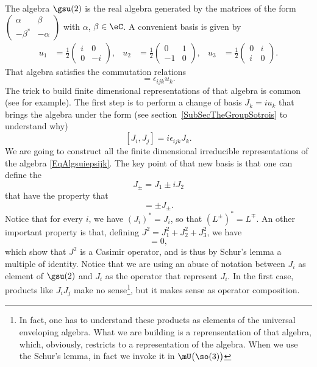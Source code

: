 The algebra $\gsu(2)$ is the real algebra generated by the matrices of the form
$
\begin{pmatrix}
\alpha  &\beta\\
-\beta^*&-\alpha
\end{pmatrix}
$ with $\alpha$, $\beta\in\eC$. A convenient basis is given by
\begin{align}       \label{EqGenssudeux}
u_1&=\frac{ 1 }{2}
\begin{pmatrix}
  i &   0   \\
  0 &   -i
\end{pmatrix},
&u_2&=
\frac{ 1 }{2}
\begin{pmatrix}
  0 &   1   \\
  -1    &   0
\end{pmatrix},
&u_3&=\frac{ 1 }{2}
\begin{pmatrix}
  0 &   i   \\
  i &   0
\end{pmatrix}.
\end{align}
That algebra satisfies the commutation relations
\begin{equation}
    [u_i,u_j]=\epsilon_{ijk}u_k.
\end{equation}
The trick to build finite dimensional representations of that algebra is common (see \cite{MQSenechal} for example). The first step is to perform a change of basis $J_k=iu_k$ that brings the algebra under the form (see section~\ref{SubSecTheGroupSotrois} to understand why)
\begin{equation}        \label{EqAlgsuiepsijk}
    [J_i,J_j]=i\epsilon_{ijk}J_k.
\end{equation}
We are going to construct all the finite dimensional irreducible representations of the algebra \eqref{EqAlgsuiepsijk}. The key point of that new basis is that one can define the 
\begin{equation}
    J_{\pm}=J_1\pm iJ_2
\end{equation}
that have the property that
\begin{equation}
    [J_3,J_{\pm}]=\pm J_{\pm}.
\end{equation}
Notice that for every $i$, we have $(J_i)^*=J_i$, so that $(L^{\pm})^*=L^{\mp}$. An other important property is that, defining $J^2=J_1^2+J_2^2+J_3^2$, we have
\begin{equation}
    [J_i,J^2]=0,
\end{equation}
which show that $J^2$ is a Casimir operator, and is thus by Schur's lemma a multiple of identity. Notice that we are using an abuse of notation between $J_i$ as element of $\gsu(2)$ and $J_i$ as the operator that represent $J_i$. In the first case, products like $J_iJ_j$ make no sense\footnote{In fact, one has to understand these products as elements of the universal enveloping algebra. What we are building is a reprensentation of that algebra, which, obviously, restricts to a representation of the algebra. When we use the Schur's lemma, in fact we invoke it in $\mU\big(\so(3)\big)$}, but it makes sense as operator composition.

